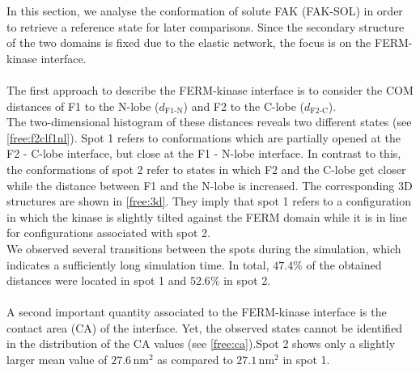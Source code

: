 \label{sec:fak_sol}
In this section, we analyse the conformation of solute FAK (FAK-SOL) in order to retrieve a reference state for later comparisons. Since the secondary structure of the two domains is fixed due to the elastic network, the focus is on the FERM-kinase interface.\\
\\
The first approach to describe the FERM-kinase interface is to consider the COM distances of F1 to the N-lobe ($d_\text{F1-N}$) and F2 to the C-lobe ($d_\text{F2-C}$).\\
The two-dimensional histogram of these distances reveals two different states (see \autoref{free:f2clf1nl}). Spot 1 refers to conformations which are partially opened at the F2 - C-lobe interface, but close at the F1 - N-lobe interface. In contrast to this, the conformations of spot 2 refer to states in which F2 and the C-lobe get closer while the distance between F1 and the N-lobe is increased. The corresponding 3D structures are shown in \autoref{free:3d}. They imply that spot 1 refers to a configuration in which the kinase is slightly tilted against the FERM domain while it is in line for configurations associated with spot 2.\\
We observed several transitions between the spots during the simulation, which indicates a sufficiently long simulation time. In total, $47.4\%$ of the obtained distances were located in spot 1 and $52.6\%$ in spot 2.\\
\\
A second important quantity associated to the FERM-kinase interface is the contact area (CA) of the interface. Yet, the observed states cannot be identified in the distribution of the CA values (see \autoref{free:ca}).Spot 2 shows only a slightly larger mean value of $27.6\,\si{\nano\metre}^2$ as compared to $27.1\,\si{\nano\metre}^2$ in spot 1.\\
%
%
%
